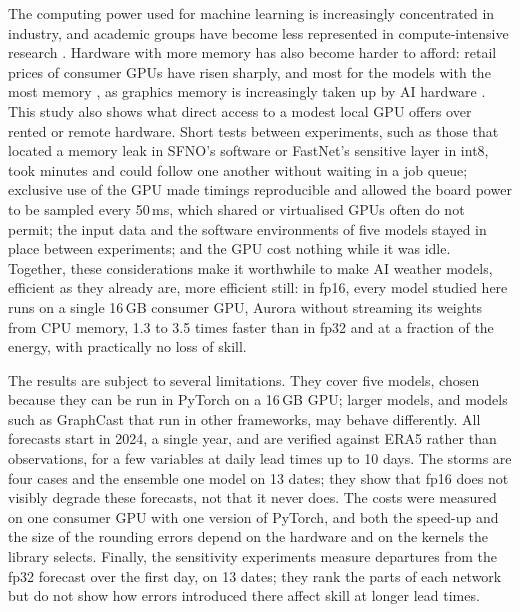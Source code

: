 The computing power used for machine learning is increasingly
concentrated in industry, and academic groups have become less
represented in compute-intensive research
\citep{ahmed2020dedemocratization, besiroglu2024compute}. Hardware with
more memory has also become harder to afford: retail prices of consumer GPUs
have risen sharply, and most for the models with the most memory
\citep{techtimes2026gpu}, as graphics memory is increasingly taken up by AI
hardware \citep{trendforce2026memory}. This study also shows what direct access to
a modest local GPU offers over rented or remote hardware. Short tests
between experiments, such as those that located a memory leak in SFNO's
software or FastNet's sensitive layer in int8, took minutes and could
follow one another without waiting in a job queue; exclusive use of the GPU made timings reproducible
and allowed the board power to be sampled every 50\,ms, which shared or
virtualised GPUs often do not permit; the input data and the software
environments of five models stayed in place between experiments; and
the GPU cost nothing while it was idle. Together, these considerations
make it worthwhile to make AI weather models, efficient as they already
are, more efficient still: in fp16, every model studied here runs on a
single 16\,GB consumer GPU, Aurora without streaming its weights from CPU
memory, 1.3 to 3.5 times faster than in fp32 and at a fraction of the
energy, with practically no loss of skill.

The results are subject to several limitations. They cover five
models, chosen because they can be run in PyTorch on a 16\,GB GPU; larger
models, and models such as GraphCast that run in other frameworks, may
behave differently. All forecasts start in 2024, a single year, and are
verified against ERA5 rather than observations, for a few variables at
daily lead times up to 10 days. The storms are four cases and the
ensemble one model on 13 dates; they show that fp16 does not visibly
degrade these forecasts, not that it never does. The costs were measured
on one consumer GPU with one version of PyTorch, and both the speed-up
and the size of the rounding errors depend on the hardware and on the
kernels the library selects. Finally, the sensitivity experiments
measure departures from the fp32 forecast over the first day, on 13
dates; they rank the parts of each network but do not show how errors
introduced there affect skill at longer lead times.

